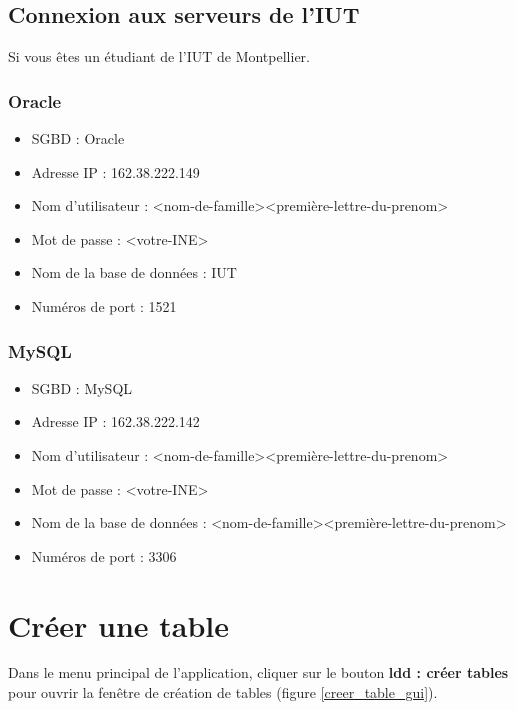 \subsection{Connexion aux serveurs de l'IUT}
Si vous êtes un étudiant de l'IUT de Montpellier.

\subsubsection{Oracle}
\begin{itemize}
\item SGBD : Oracle
\item Adresse IP : 162.38.222.149
\item Nom d'utilisateur : <nom-de-famille><première-lettre-du-prenom>
\item Mot de passe : <votre-INE>
\item Nom de la base de données : IUT
\item Numéros de port : 1521 \\
\end{itemize}

\subsubsection{MySQL}
\begin{itemize}
\item SGBD : MySQL
\item Adresse IP : 162.38.222.142
\item Nom d'utilisateur : <nom-de-famille><première-lettre-du-prenom>
\item Mot de passe : <votre-INE>
\item Nom de la base de données : <nom-de-famille><première-lettre-du-prenom>
\item Numéros de port : 3306
\end{itemize}

\section{Créer une table}
Dans le menu principal de l'application, cliquer sur le bouton \textbf{\gls{ldd} : créer tables} pour ouvrir la fen\^etre de création de tables (figure \ref{creer_table_gui}).

